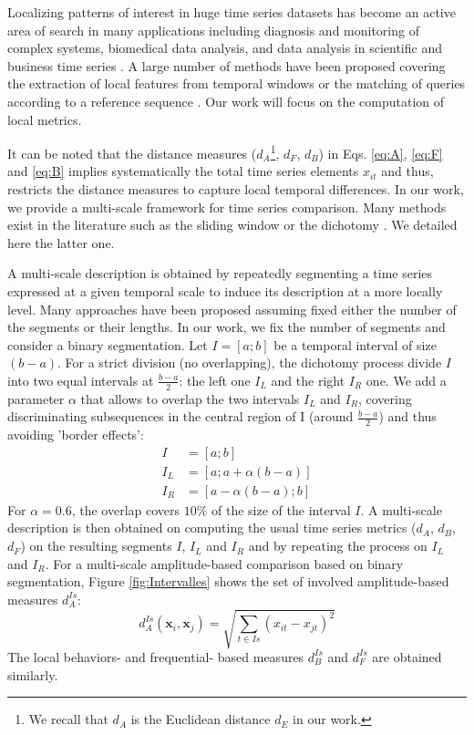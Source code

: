 Localizing patterns of interest in huge time series datasets has become an active area of search in many applications including diagnosis and monitoring of complex systems, biomedical data analysis, and data analysis in scientific and business time series . A large number of methods have been proposed covering the extraction of local features from temporal windows \cite{Berndt1994a} or the matching of queries according to a reference sequence \cite{Faloutsos1994}. Our work will focus on the computation of local metrics.

It can be noted that the distance measures ($d_A$\footnote{We recall that $d_A$ is the Euclidean distance $d_E$ in our work.}, $d_F$, $d_B$) in Eqs. \ref{eq:A}, \ref{eq:F} and \ref{eq:B} implies systematically the total time series elements $x_{it}$ and thus, restricts the distance measures to capture local temporal differences. In our work, we provide a multi-scale framework for time series comparison. Many methods exist in the literature such as the sliding window or the dichotomy . We detailed here the latter one.


A multi-scale description is obtained by repeatedly segmenting a time series expressed at a given temporal scale to induce its description at a more locally level. Many approaches have been proposed assuming fixed either the number of the segments or their lengths. In our work, we fix the number of segments and consider a binary segmentation. Let $I=[a;b]$ be a temporal interval of size $(b-a)$. For a strict division (no overlapping), the dichotomy process divide $I$  into two equal intervals at $\frac{b-a}{2}$: the left one $I_L$ and the right $I_R$ one. We add a parameter $\alpha$ that allows to overlap the two intervals $I_L$ and $I_R$, covering discriminating subsequences in the central region of I (around $\frac{b-a}{2}$) and thus avoiding 'border effects':
\begin{align}
	I &= [a;b] \\
	I_L &= [a;a+\alpha(b-a)] \\
	I_R &= [a-\alpha(b-a);b] 
\label{key}
\end{align}
\noindent For $\alpha = 0.6$, the overlap covers $10\%$ of the size of the interval $I$. A multi-scale description is then obtained on computing the usual time series metrics ($d_A$, $d_B$, $d_F$) on the resulting segments $I$, $I_L$ and $I_R$ and by repeating the process on $I_L$ and $I_R$. For a multi-scale amplitude-based comparison based on binary segmentation, Figure \ref{fig:Intervalles} shows the set of involved amplitude-based measures $d^{Is}_A$:
\begin{equation}	
d^{Is}_A(\textbf{x}_i,\textbf{x}_j) = \sqrt{\sum\limits_{t \in Is} (x_{it}-x_{jt})^2}
\label{eq:A2}
\end{equation}
The local behaviors- and frequential- based measures $d^{Is}_B$ and $d^{Is}_F$ are obtained similarly.

